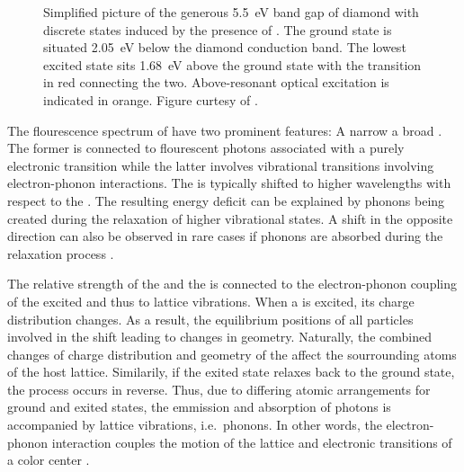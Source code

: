     \begin{figure}[htbp]
      \centering
      \caption[Band gap of \sivs hosted in diamond]{Simplified picture of the generous \SI{5.5}{\eV} band gap of diamond with discrete states induced by the presence of \sivs. The \siv ground state is situated \SI{2.05}{\eV} below the diamond conduction band. The lowest excited state sits \SI{1.68}{\eV} above the ground state with the \zpl transition in red connecting the two. Above-resonant optical excitation is indicated in orange. Figure curtesy of \cite{becker::thesis}.}
      \label{fig::above_resonant_excitation}
    \end{figure}

    The flourescence spectrum of \sivs have two prominent features: A narrow \zpl a broad \psb. The former is connected to flourescent photons associated with a purely electronic transition while the latter involves vibrational transitions involving electron-phonon interactions. The \psb is typically shifted to higher wavelengths with respect to the \zpl. The resulting energy deficit can be explained by phonons being created during the relaxation of higher vibrational states. A shift in the opposite direction can also be observed in rare cases if phonons are absorbed during the relaxation process \cite{becker::36}.

    The relative strength of the \zpl and the \psb is connected to the electron-phonon coupling of the excited \cc and thus to lattice vibrations. When a \cc is excited, its charge distribution changes. As a result, the equilibrium positions of all particles involved in the \cc shift leading to changes in \cc geometry. Naturally, the combined changes of charge distribution and geometry of the \cc affect the sourrounding atoms of the host lattice. Similarily, if the exited state relaxes back to the ground state, the process occurs in reverse. Thus, due to differing atomic arrangements for ground and exited states, the emmission and absorption of photons is accompanied by lattice vibrations, i.e.\ phonons. In other words, the electron-phonon interaction couples the motion of the lattice and electronic transitions of a color center \cite{neu::94, neu::25}.

